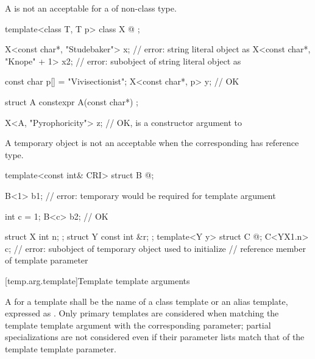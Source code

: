 \pnum
\begin{note}
A  is
not an acceptable 
for a  of non-class type.
\begin{example}
\begin{codeblock}
template<class T, T p> class X {
  @\commentellip@
};

X<const char*, "Studebaker"> x; // error: string literal object as 
X<const char*, "Knope" + 1> x2; // error: subobject of string literal object as 

const char p[] = "Vivisectionist";
X<const char*, p> y;            // OK

struct A {
  constexpr A(const char*) {}
};

X<A, "Pyrophoricity"> z;        // OK,  is a constructor argument to 
\end{codeblock}
\end{example}
\end{note}

\pnum
\begin{note}
A temporary object
is not an acceptable
when the corresponding
has reference type.
\begin{example}
\begin{codeblock}
template<const int& CRI> struct B { @\commentellip@ };

B<1> b1;                        // error: temporary would be required for template argument

int c = 1;
B<c> b2;                        // OK

struct X { int n; };
struct Y { const int &r; };
template<Y y> struct C { @\commentellip@ };
C<Y{X{1}.n}> c;                 // error: subobject of temporary object used to initialize
                                // reference member of template parameter
\end{codeblock}
\end{example}
\end{note}

[temp.arg.template]{Template template arguments}

\pnum
A
for a template
shall be the name of a class template or an alias template, expressed as
.
Only primary templates are considered when matching the template template
argument with the corresponding parameter; partial specializations are not
considered even if their parameter lists match that of the template template
parameter.

